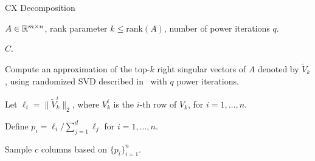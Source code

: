 
 \begin{algorithm}[tb]
 \caption{CX Decomposition}
  \label{alg:cx}
  \begin{algorithmic}[1]
    \Require $A \in \mathbb{R}^{m\times n}$, rank parameter $k \leq \textrm{rank}(A)$, number of power iterations $q$.

    \Ensure $C$.
    

    \State Compute an approximation of the top-$k$ right singular vectors of $A$ denoted by $\tilde V_k$, using randomized SVD described in~\cite{HMT11} with $q$ power iterations.
    
    \State Let $\ell_i = \| \tilde V_k^i\|_2$, where $V_k^i$ is the $i$-th row of $V_k$, for $i = 1, \ldots, n$. 
    
    \State Define $p_i = \ell_i / \sum_{j=1}^d \ell_j$ for $i=1,\ldots,n$.
    
    \State Sample $c$ columns based on $\{p_i\}_{i=1}^n$.

    

    \end{algorithmic}
\end{algorithm}



